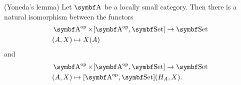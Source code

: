 \begin{theorem}(Yoneda's lemma)\label{def:yoneda_lemma}\cite[theorem 4.2.1]{Leinster2014}
  Let \( \Bold A \) be a locally small category. Then there is a natural isomorphism between the functors
  \begin{align*}
    &\Bold{A}^{\Op} \times [\Bold{A}^{\Op}, \Bold{Set}] \to \Bold{Set} \\
    &(A, X) \mapsto X(A)
  \end{align*}
  and
  \begin{align*}
    &\Bold{A}^{\Op} \times [\Bold{A}^{\Op}, \Bold{Set}] \to \Bold{Set} \\
    &(A, X) \mapsto [\Bold{A}^{\Op}, \Bold{Set}](H_A, X).
  \end{align*}
\end{theorem}
